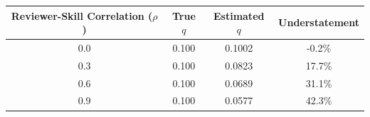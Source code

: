 \begin{tabular}{cccc}
\hline
\textbf{Reviewer-Skill Correlation ($\rho$)} & \textbf{True $q$} & \textbf{Estimated $q$} & \textbf{Understatement} \\
\hline
0.0 & 0.100 & 0.1002 & -0.2\% \\
0.3 & 0.100 & 0.0823 & 17.7\% \\
0.6 & 0.100 & 0.0689 & 31.1\% \\
0.9 & 0.100 & 0.0577 & 42.3\% \\
\hline
\end{tabular}
